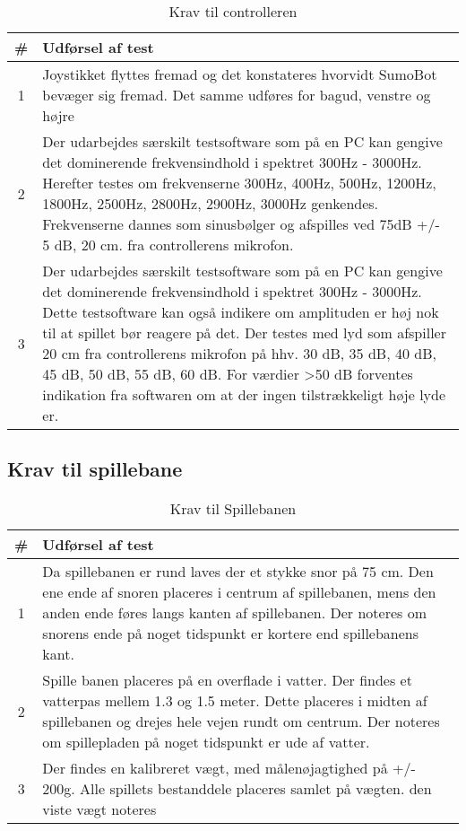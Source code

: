\begin{table}[]
\centering
\caption{Krav til controlleren}\label{tab:Controller Krav}
\begin{tabular}{c p{7cm}}
\# & \textbf{Udførsel af test} \\ \midrule
1 & Joystikket flyttes fremad og det konstateres hvorvidt SumoBot bevæger sig fremad. Det samme udføres for bagud, venstre og højre  \\\midrule
2 & Der udarbejdes særskilt testsoftware som på en PC kan gengive det dominerende frekvensindhold i spektret 300Hz - 3000Hz. Herefter testes om frekvenserne 300Hz, 400Hz, 500Hz, 1200Hz, 1800Hz, 2500Hz, 2800Hz, 2900Hz, 3000Hz genkendes. Frekvenserne dannes som sinusbølger og afspilles ved 75dB +/- 5 dB, 20 cm. fra controllerens mikrofon. \\\midrule
3 & Der udarbejdes særskilt testsoftware som på en PC kan gengive det dominerende frekvensindhold i spektret 300Hz - 3000Hz. Dette testsoftware kan også indikere om amplituden er høj nok til at spillet bør reagere på det. Der testes med lyd som afspiller 20 cm fra controllerens mikrofon på hhv. 30 dB, 35 dB, 40 dB, 45 dB, 50 dB, 55 dB, 60 dB. For værdier >50 dB forventes indikation fra softwaren om at der ingen tilstrækkeligt høje lyde er.\\\bottomrule
\end{tabular}
\end{table}

\subsection{Krav til spillebane}

\begin{table}[]
\centering
\caption{Krav til Spillebanen}\label{tab:ASE Krav}
\begin{tabular}{c p{7cm}}
\# & \textbf{Udførsel af test} \\ \midrule
1 & Da spillebanen er rund laves der et stykke snor på 75 cm. Den ene ende af snoren placeres i centrum af spillebanen, mens den anden ende føres langs kanten af spillebanen. Der noteres om snorens ende på noget tidspunkt er kortere end spillebanens kant. \\\midrule
2 & Spille banen placeres på en overflade i vatter. Der findes et vatterpas mellem 1.3 og 1.5 meter. Dette placeres i midten af spillebanen og drejes hele vejen rundt om centrum. Der noteres om spillepladen på noget tidspunkt er ude af vatter.  \\\midrule

3 &  Der findes en kalibreret vægt, med målenøjagtighed på +/- 200g. Alle spillets bestanddele placeres samlet på vægten. den viste vægt noteres\\\midrule

\end{tabular}
\end{table}

